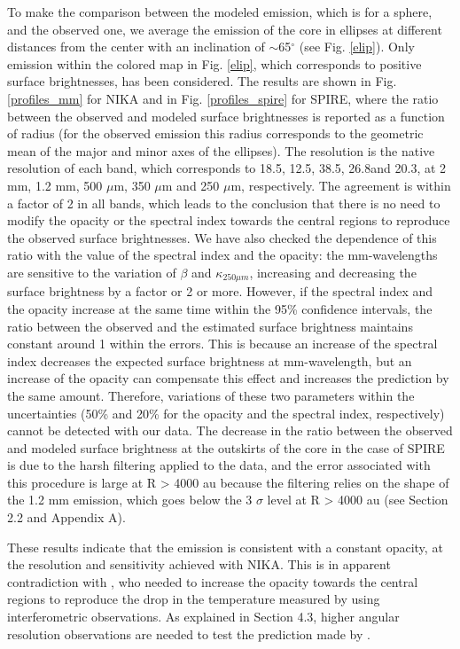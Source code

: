 \documentclass{aa}
\begin{document}
To make the comparison between the modeled emission, which is for a sphere, and the observed one, we average the emission of the core in ellipses at different distances from the center with an inclination of $\sim$65$^{\circ}$ (see Fig. \ref{elip}). Only emission within the colored map in Fig. \ref{elip}, which corresponds to positive surface brightnesses, has been considered. The results are shown in Fig. \ref{profiles_mm} for NIKA and in Fig. \ref{profiles_spire} for SPIRE, where the ratio between the observed and modeled surface brightnesses is reported as a function of radius (for the observed emission this radius corresponds to the geometric mean of the major and minor axes of the ellipses). The resolution is the native resolution of each band, which corresponds to 18.5\arcsec, 12.5\arcsec, 38.5\arcsec, 26.8\arcsec and 20.3\arcsec, at 2 mm, 1.2 mm, 500 $\mu$m, 350 $\mu$m and 250 $\mu$m, respectively. The agreement is within a factor of 2 in all bands, which leads to the conclusion that there is no need to modify the opacity or the spectral index towards the central regions to reproduce the observed surface brightnesses. We have also checked the dependence of this ratio with the value of the spectral index and the opacity: the mm-wavelengths are sensitive to the variation of $\beta$ and $\kappa_{250 \mu m}$, increasing and decreasing the surface brightness by a factor or 2 or more. However, if the spectral index and the opacity increase at the same time within the 95\% confidence intervals, the ratio between the observed and the estimated surface brightness maintains constant around 1 within the errors. This is because an increase of the spectral index decreases the expected surface brightness at mm-wavelength, but an increase of the opacity can compensate this effect and increases the prediction by the same amount. Therefore, variations of these two parameters within the uncertainties (50\% and 20\% for the opacity and the spectral index, respectively) cannot be detected with our data. The decrease in the ratio between the observed and modeled surface brightness at the outskirts of the core in the case of SPIRE is due to the harsh filtering applied to the data, and the error associated with this procedure is large at R > 4000 au because the filtering relies on the shape of the 1.2 mm emission, which goes below the 3 $\sigma$ level at R > 4000 au (see Section 2.2 and Appendix A). 

These results indicate that the emission is consistent with a constant opacity, at the resolution and sensitivity achieved with NIKA. This is in apparent contradiction with , who needed to increase the opacity towards the central regions to reproduce the drop in the temperature measured by  using interferometric observations. As explained in Section 4.3, higher angular resolution observations are needed to test the prediction made by . 
\end{document}
